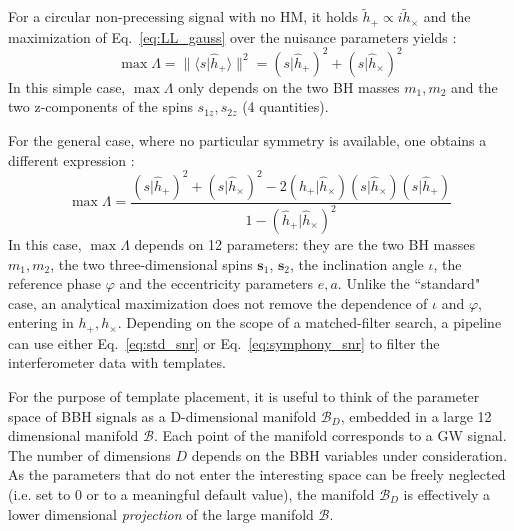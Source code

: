\documentclass[twocolumn,showpacs,preprintnumbers,nofootinbib,prd,
superscriptaddress,10pt]{revtex4-2}
\newcommand{\scalar}[2]{\langle #1|#2 \rangle}
\newcommand{\rescalar}[2]{( #1 |#2 )}
\begin{document}
For a circular non-precessing signal with no HM, it holds $\tilde{h}_+ \propto i\tilde{h}_\times$ and the maximization of Eq.~\eqref{eq:LL_gauss} over the nuisance parameters yields \cite{Maggiore:2007ulw}:
\begin{equation}\label{eq:std_snr}
	\max \Lambda = \lVert \scalar{s}{\hat{h}_+} \rVert^2 = \rescalar{s}{\hat{h}_+}^2 + \rescalar{s}{\hat{h}_\times}^2
\end{equation}
In this simple case, $\max\Lambda$ only depends on the two BH masses $m_1, m_2$ and the two z-components of the spins $s_{1z}, s_{2z}$ (4 quantities).

For the general case, where no particular symmetry is available, one obtains a different expression \cite{Capano:2013raa, Schmidt:2014iyl, Harry:2017weg}:
\begin{equation}\label{eq:symphony_snr}
	\max \Lambda = \frac{ \rescalar{s}{\hat{h}_+}^2 + \rescalar{s}{\hat{h}_\times}^2 -2\rescalar{\hat{h}_+}{\hat{h}_\times}\rescalar{s}{\hat{h}_\times}\rescalar{s}{\hat{h}_+}}{1- \rescalar{\hat{h}_+}{\hat{h}_\times}^2}
\end{equation}
In this case, $\max\Lambda$ depends on 12 parameters: they are the two BH masses $m_1, m_2$, the two three-dimensional spins $\mathbf{s}_1$, $\mathbf{s}_2$, the inclination angle $\iota$, the reference phase $\varphi$ and the eccentricity parameters $e, a$.
Unlike the ``standard" case, an analytical maximization does not remove the dependence of $\iota$ and $\varphi$, entering in $h_+, h_\times$.
%
Depending on the scope of a matched-filter search, a pipeline can use either Eq.~\eqref{eq:std_snr} or Eq.~\eqref{eq:symphony_snr} to filter the interferometer data with templates.

For the purpose of template placement, it is useful to think of the parameter space of BBH signals as a D-dimensional manifold $\mathcal{B}_D$, embedded in a large 12 dimensional manifold $\mathcal{B}$. Each point of the manifold corresponds to a GW signal. The number of dimensions $D$ depends on the BBH variables under consideration.
As the parameters that do not enter the interesting space can be freely neglected (i.e. set to $0$ or to a meaningful default value), the manifold $\mathcal{B}_D$ is effectively a lower dimensional {\it projection} of the large manifold $\mathcal{B}$.
\end{document}
